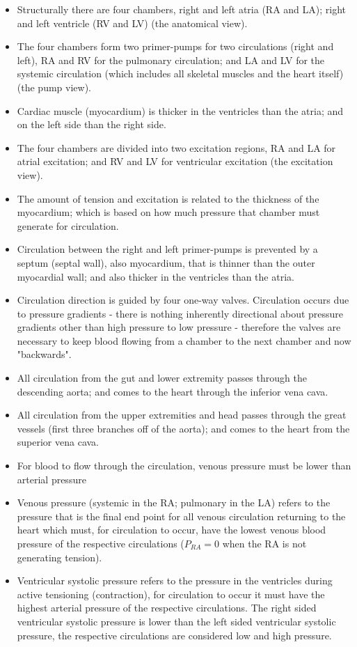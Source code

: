 \begin{itemize}
    \item Structurally there are four chambers, right and left atria (RA and LA); right and left ventricle (RV and LV) (the anatomical view).
    \item The four chambers form two primer-pumps for two circulations (right and left), RA and RV for the pulmonary circulation; and LA and LV for the systemic circulation (which includes all skeletal muscles and the heart itself) (the pump view).
    \item Cardiac muscle (myocardium) is thicker in the ventricles than the atria; and on the left side than the right side.
    \item The four chambers are divided into two excitation regions, RA and LA for atrial excitation; and RV and LV for ventricular excitation (the excitation view).
    \item The amount of tension and excitation is related to the thickness of the myocardium; which is based on how much pressure that chamber must generate for circulation.
    \item Circulation between the right and left primer-pumps is prevented by a septum (septal wall), also myocardium, that is thinner than the outer myocardial wall; and also thicker in the ventricles than the atria.
    \item Circulation direction is guided by four one-way valves. Circulation occurs due to pressure gradients - there is nothing inherently directional about pressure gradients other than high pressure to low pressure - therefore the valves are necessary to keep blood flowing from a chamber to the next chamber and now "backwards".
    \item All circulation from the gut and lower extremity passes through the descending aorta; and comes to the heart through the inferior vena cava.
    \item All circulation from the upper extremities and head passes through the great vessels (first three branches off of the aorta); and comes to the heart from the superior vena cava.
    \item For blood to flow through the circulation, venous pressure must be lower than arterial pressure
    \item Venous pressure (systemic in the RA; pulmonary in the LA) refers to the pressure that is the final end point for all venous circulation returning to the heart which must, for circulation to occur, have the lowest venous blood pressure of the respective circulations ($P_{RA} = 0$ when the RA is not generating tension). \item Ventricular systolic pressure refers to the pressure in the ventricles during active tensioning (contraction), for circulation to occur it must have the highest arterial pressure of the respective circulations. The right sided ventricular systolic pressure is lower than the left sided ventricular systolic pressure, the respective circulations are considered low and high pressure.

\end{itemize}
